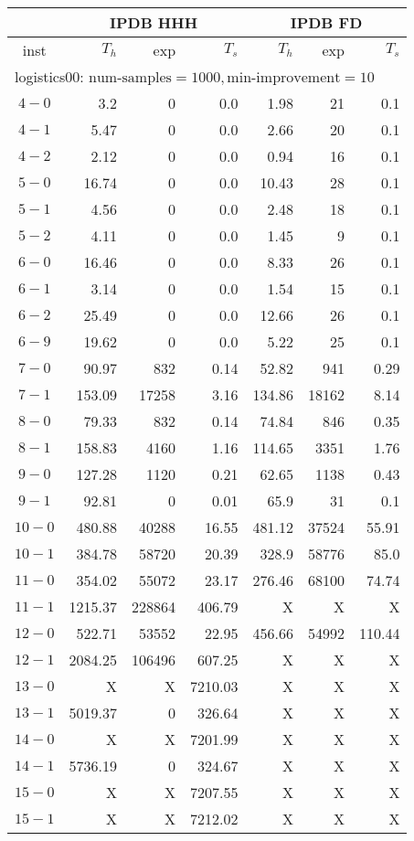 \begin{longtable}{|c||r|r|r||r|r|r|}\firsthline
& \multicolumn{3}{c||}{IPDB HHH} & \multicolumn{3}{c||}{IPDB FD}\\\hline
inst & $T_h$ & exp & $T_s$ & $T_h$ & exp & $T_s$\\\hline
\multicolumn{7}{|l|}{logistics00: $\text{num-samples}=1000,\text{min-improvement}=10$}\\\hline
$4-0$ & 3.2 & 0 & 0.0 & 1.98 & 21 & 0.1 \\\hline
$4-1$ & 5.47 & 0 & 0.0 & 2.66 & 20 & 0.1 \\\hline
$4-2$ & 2.12 & 0 & 0.0 & 0.94 & 16 & 0.1 \\\hline
$5-0$ & 16.74 & 0 & 0.0 & 10.43 & 28 & 0.1 \\\hline
$5-1$ & 4.56 & 0 & 0.0 & 2.48 & 18 & 0.1 \\\hline
$5-2$ & 4.11 & 0 & 0.0 & 1.45 & 9 & 0.1 \\\hline
$6-0$ & 16.46 & 0 & 0.0 & 8.33 & 26 & 0.1 \\\hline
$6-1$ & 3.14 & 0 & 0.0 & 1.54 & 15 & 0.1 \\\hline
$6-2$ & 25.49 & 0 & 0.0 & 12.66 & 26 & 0.1 \\\hline
$6-9$ & 19.62 & 0 & 0.0 & 5.22 & 25 & 0.1 \\\hline
$7-0$ & 90.97 & 832 & 0.14 & 52.82 & 941 & 0.29 \\\hline
$7-1$ & 153.09 & 17258 & 3.16 & 134.86 & 18162 & 8.14 \\\hline
$8-0$ & 79.33 & 832 & 0.14 & 74.84 & 846 & 0.35 \\\hline
$8-1$ & 158.83 & 4160 & 1.16 & 114.65 & 3351 & 1.76 \\\hline
$9-0$ & 127.28 & 1120 & 0.21 & 62.65 & 1138 & 0.43 \\\hline
$9-1$ & 92.81 & 0 & 0.01 & 65.9 & 31 & 0.1 \\\hline
$10-0$ & 480.88 & 40288 & 16.55 & 481.12 & 37524 & 55.91 \\\hline
$10-1$ & 384.78 & 58720 & 20.39 & 328.9 & 58776 & 85.0 \\\hline
$11-0$ & 354.02 & 55072 & 23.17 & 276.46 & 68100 & 74.74 \\\hline
$11-1$ & 1215.37 & 228864 & 406.79 & X & X & X \\\hline
$12-0$ & 522.71 & 53552 & 22.95 & 456.66 & 54992 & 110.44 \\\hline
$12-1$ & 2084.25 & 106496 & 607.25 & X & X & X \\\hline
$13-0$ & X & X & 7210.03 & X & X & X \\\hline
$13-1$ & 5019.37 & 0 & 326.64 & X & X & X \\\hline
$14-0$ & X & X & 7201.99 & X & X & X \\\hline
$14-1$ & 5736.19 & 0 & 324.67 & X & X & X \\\hline
$15-0$ & X & X & 7207.55 & X & X & X \\\hline
$15-1$ & X & X & 7212.02 & X & X & X \\\hline


\end{longtable}
